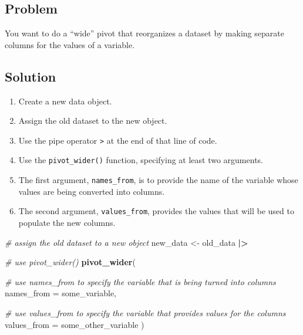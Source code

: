 \documentclass[
]{book}
\newenvironment{Shaded}{\begin{snugshade}}{\end{snugshade}}
\newcommand{\AttributeTok}[1]{\textcolor[rgb]{0.13,0.29,0.53}{#1}}
\newcommand{\CommentTok}[1]{\textcolor[rgb]{0.56,0.35,0.01}{\textit{#1}}}
\newcommand{\FunctionTok}[1]{\textcolor[rgb]{0.13,0.29,0.53}{\textbf{#1}}}
\newcommand{\NormalTok}[1]{#1}
\newcommand{\OtherTok}[1]{\textcolor[rgb]{0.56,0.35,0.01}{#1}}
\newcommand{\SpecialCharTok}[1]{\textcolor[rgb]{0.81,0.36,0.00}{\textbf{#1}}}
\providecommand{\tightlist}{%
  \setlength{\itemsep}{0pt}\setlength{\parskip}{0pt}}
\begin{document}
\hypertarget{problem-25}{%
\subsection{Problem}\label{problem-25}}

You want to do a ``wide'' pivot that reorganizes a dataset by making separate columns for the values of a variable.

\hypertarget{solution-24}{%
\subsection{Solution}\label{solution-24}}

\begin{enumerate}
\def\labelenumi{\arabic{enumi}.}
\tightlist
\item
  Create a new data object.
\item
  Assign the old dataset to the new object.
\item
  Use the pipe operator \texttt{\textbar{}\textgreater{}} at the end of that line of code.
\item
  Use the \texttt{pivot\_wider()} function, specifying at least two arguments.
\item
  The first argument, \texttt{names\_from}, is to provide the name of the variable whose values are being converted into columns.
\item
  The second argument, \texttt{values\_from}, provides the values that will be used to populate the new columns.
\end{enumerate}

\begin{Shaded}
\begin{Highlighting}[]
\CommentTok{\# assign the old dataset to a new object}
\NormalTok{new\_data }\OtherTok{\textless{}{-}}\NormalTok{ old\_data }\SpecialCharTok{|\textgreater{}}
  
  \CommentTok{\# use pivot\_wider()}
  \FunctionTok{pivot\_wider}\NormalTok{(}
    
    \CommentTok{\# use \textasciigrave{}names\_from\textasciigrave{} to specify the variable that is being turned into columns}
    \AttributeTok{names\_from =}\NormalTok{ some\_variable,}
    
    \CommentTok{\# use \textasciigrave{}values\_from\textasciigrave{} to specify the variable that provides values for the columns}
    \AttributeTok{values\_from =}\NormalTok{ some\_other\_variable}
\NormalTok{  )}
\end{Highlighting}
\end{Shaded}
\end{document}
